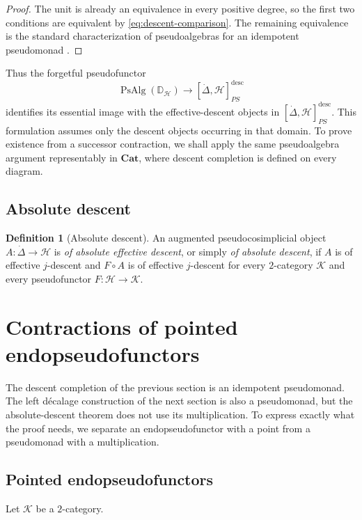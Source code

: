 \documentclass[11pt,a4paper]{article}
\numberwithin{equation}{section}
\theoremstyle{definition}
\newtheorem{definition}[definition]{Definition}
\theoremstyle{remark}
\newcommand{\Hcat}{\mathcal H}
\newcommand{\Kcat}{\mathcal K}
\newcommand{\Cat}{\mathbf{Cat}}
\newcommand{\Dmon}{\mathbb D}
\newcommand{\PsAlg}{\operatorname{PsAlg}}
\begin{document}
\begin{proof}
The unit is already an equivalence in every positive degree, so the
first two conditions are equivalent by
\eqref{eq:descent-comparison}. The remaining equivalence is the
standard characterization of pseudoalgebras for an idempotent
pseudomonad \cite[Theorem~2.20]{Nunes2018}.
\end{proof}

Thus the forgetful pseudofunctor
\[
  \PsAlg(\Dmon_{\Hcat})\longrightarrow
  [\dot\Delta,\Hcat]_{PS}^{\mathrm{desc}}
\]
identifies its essential image with the effective-descent objects
in \([\dot\Delta,\Hcat]_{PS}^{\mathrm{desc}}\). This formulation
assumes only the descent objects occurring in that domain. To
prove existence from a successor contraction, we shall apply the
same pseudoalgebra argument representably in \(\Cat\), where
descent completion is defined on every diagram.

\subsection{Absolute descent}

\begin{definition}[Absolute descent]
\label{def:absolute-descent}
An augmented pseudocosimplicial object
$A\colon\dot\Delta\to\Hcat$ is \emph{of absolute effective descent},
or simply \emph{of absolute descent}, if $A$ is of effective
$j$-descent and $F\circ A$ is of effective $j$-descent for every
$2$-category $\Kcat$ and every pseudofunctor $F\colon\Hcat\to\Kcat$.
\end{definition}

\section{Contractions of pointed endopseudofunctors}
\label{sec:contractions}

The descent completion of the previous section is an idempotent
pseudomonad. The left d\'ecalage construction of the next section is also a
pseudomonad, but the absolute-descent theorem does not use its
multiplication. To express exactly what the proof needs, we separate
an endopseudofunctor with a point from a pseudomonad with a
multiplication.

\subsection{Pointed endopseudofunctors}

Let $\Kcat$ be a $2$-category.
\end{document}
